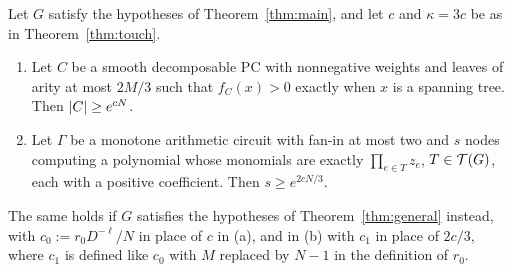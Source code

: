 \begin{corollary}\label{cor:support}
Let $G$ satisfy the hypotheses of Theorem~\ref{thm:main}, and let $c$ and $\kappa=3c$ be as in Theorem~\ref{thm:touch}.
\begin{enumerate}[label=(\alph*)]
\item Let $C$ be a smooth decomposable PC with nonnegative weights and leaves of arity at most $2M/3$ such that $f_C(x)>0$ exactly when $x$ is a spanning tree. Then $\lvert C\rvert\ge e^{cN}$.
\item Let $\Gamma$ be a monotone arithmetic circuit with fan-in at most two and $s$ nodes computing a polynomial whose monomials are exactly $\prod_{e\in T}z_e$, $T\in\mathcal{T}(G)$, each with a positive coefficient. Then $s\ge e^{2cN/3}$.
\end{enumerate}
The same holds if $G$ satisfies the hypotheses of Theorem~\ref{thm:general} instead, with $c_0:=r_0D^{-\ell}/N$ in place of $c$ in (a), and in (b) with $c_1$ in place of $2c/3$, where $c_1$ is defined like $c_0$ with $M$ replaced by $N-1$ in the definition of $r_0$.
\end{corollary}


